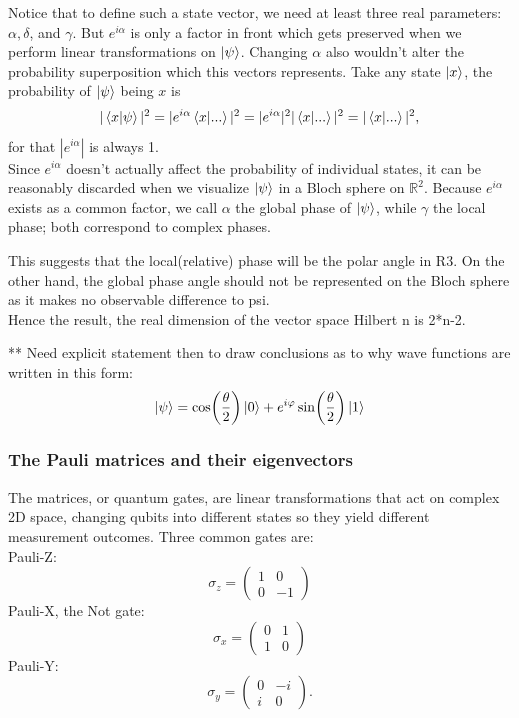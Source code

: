 \documentclass[12pt]{article}
\begin{document}
Notice that to define such a state vector, we need at least three real parameters: $\alpha, \delta$, and $\gamma$. But $e^{i\alpha}$ is only a factor in front which gets preserved when we perform linear transformations on $\ket{\psi}$. Changing $\alpha$ also wouldn't alter the probability superposition which this vectors represents. Take any state $\ket{x}$, the probability of $\ket{\psi}$ being $x$ is
$$|\braket{x}{\psi}|^2=|e^{i\alpha}\braket{x}{...}|^2=|e^{i\alpha}|^2|\braket{x}{...}|^2=|\braket{x}{...}|^2,$$
for that $|e^{i\alpha}|$ is always 1. \\

Since $e^{i\alpha}$ doesn't actually affect the probability of individual states, it can be reasonably discarded when we visualize $\ket{\psi}$ in a Bloch sphere on $\mathbb{R}^2$. Because $e^{i\alpha}$ exists as a common factor, we call $\alpha$ the global phase of $\ket{\psi}$, while $\gamma$ the local phase; both correspond to complex phases.

This suggests that the local(relative) phase will be the polar angle in R3. On the other hand, the global phase angle should not be represented on the Bloch sphere as it makes no observable difference to psi.\\


Hence the result, the real dimension of the vector space Hilbert n is 2*n-2. %

** Need explicit statement then to draw conclusions as to why wave functions are written in this form: \[\ket{\psi} = \cos(\frac{\theta}{2})\ket{0}
+ e^{i\varphi}\sin(\frac{\theta}{2})\ket{1}\]

\subsubsection{The Pauli matrices and their eigenvectors}
The matrices, or quantum gates, are linear transformations that act on complex 2D space, changing qubits into different states so they yield different measurement outcomes. Three common gates are:\\
Pauli-Z:
$$\sigma_z=\begin{pmatrix}
1 & 0\\
0 & -1
\end{pmatrix}$$
Pauli-X, the Not gate:
$$\sigma_x=\begin{pmatrix}
0 & 1\\
1 & 0
\end{pmatrix}$$
Pauli-Y:
$$\sigma_y=\begin{pmatrix}
0 & -i\\
i & 0
\end{pmatrix}.$$
\end{document}

